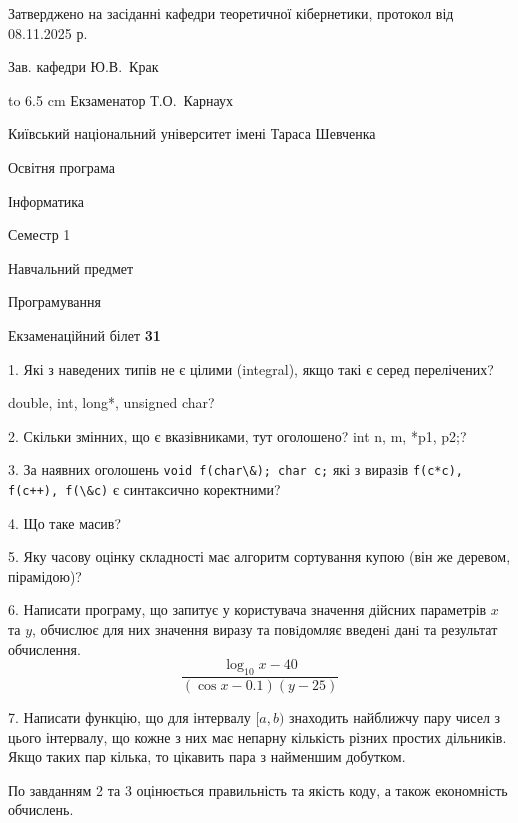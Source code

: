 \documentclass[12pt, ukrainian]{article}
\def\code#1{\Verb!#1!}
\begin{document}
{\smallskip\smallskip \begin {scriptsize} Затверджено на засіданні кафедри теоретичної кібернетики, протокол   від   08.11.2025 р.\par\smallskip\smallskip\smallskip\smallskip
{\parbox {6.5 cm} {Зав. кафедри \dotfill Ю.В.~Крак}}\hspace {0.7cm} {\hbox to 6.5 cm { Екзаменатор \dotfill Т.О.~Карнаух}} \end{scriptsize}}
\newpage
{{\begin {scriptsize}\par
{ \center  Київський національний університет імені Тараса Шевченка \par}
{\parbox {5 cm}{Освітня програма \hfill}{\parbox {7 cm}{Інформатика\hfill}}\parbox {6 cm}{\hfill Семестр 1}}\par
{\parbox {5 cm} {Навчальний предмет \hfill}\parbox {7 cm}{Програмування \hfill}\parbox {6cm}{\hfill}\par}\vspace{-15pt} \end{scriptsize}}{\center Екзаменаційний білет \No \textbf { 31 }\par}}
{%
1. Які з наведених типів не є цілими (integral), якщо такі є серед перелічених?

double, int, long*, unsigned char?
\par
\vspace{2mm}
2. Скільки змінних, що є вказівниками, тут оголошено?
int n, m, *p1, p2;?
\par
\vspace{2mm}
3. За наявних оголошень \code{void f(char\&); char c;} які з виразів \code{f(c*c), f(c++), f(\&c)} є синтаксично коректними?
\par
\vspace{2mm}
4. Що таке масив?
\par
\vspace{2mm}
5. Яку часову оцінку складності має алгоритм сортування купою (він же деревом, пірамідою)?
\par
\vspace{2mm}
6. Написати програму, що запитує у користувача значення дійсних параметрів $x$ та $y$, обчислює для них значення виразу та повiдомляє введенi данi та результат обчислення.
$$\frac{\log_{10} x - 40}{(\cos x - 0.1) (y - 25)}$$ 

\par
7. Написати функцію, що для інтервалу $[a, b)$ знаходить найближчу пару чисел з цього інтервалу, що кожне з них має непарну кількість різних простих дільників. Якщо таких пар кілька, то цікавить пара з найменшим добутком.

По завданням 2 та 3 оцінюється правильність та якість коду, а також економність обчислень.

}
\end{document}
